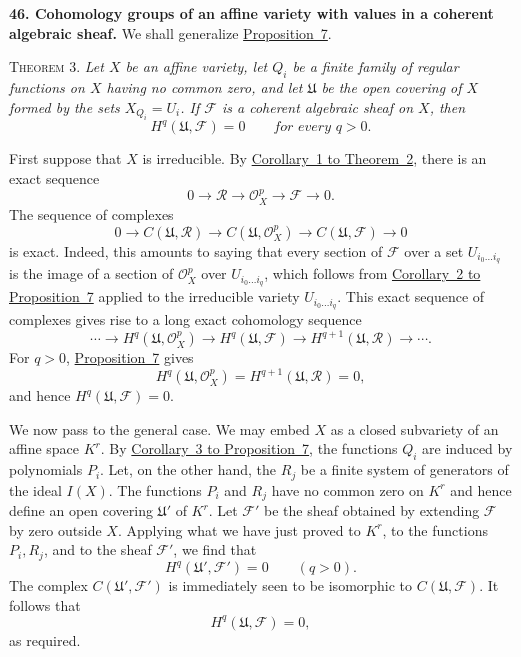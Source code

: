 
\medskip
{}\label{fac:II:3:no:46}
\textbf{46. Cohomology groups of an affine variety with values in a coherent algebraic sheaf.}
We shall generalize \hyperref[fac:II:3:no:44:prop:7]{Proposition~7}.

\label{fac:II:3:no:46:thm:3}
\textsc{Theorem 3.} \textit{Let $X$ be an affine variety, let $Q_i$ be a finite family of regular functions on $X$ having no common zero, and let $\mathfrak{U}$ be the open covering of $X$ formed by the sets $X_{Q_i}=U_i$. If $\mathcal{F}$ is a coherent algebraic sheaf on $X$, then}
\[
H^q(\mathfrak{U},\mathcal{F})=0
\qquad\textit{for every $q>0$.}
\]

First suppose that $X$ is irreducible. By \hyperref[fac:II:3:no:45:thm:2:cor:1]{Corollary~1 to Theorem~2}, there is an exact sequence
\[
0\longrightarrow\mathcal{R}
\longrightarrow\mathcal{O}_X^p
\longrightarrow\mathcal{F}
\longrightarrow0.
\]
The sequence of complexes
\[
0\longrightarrow C(\mathfrak{U},\mathcal{R})
\longrightarrow C(\mathfrak{U},\mathcal{O}_X^p)
\longrightarrow C(\mathfrak{U},\mathcal{F})
\longrightarrow0
\]
is exact. Indeed, this amounts to saying that every section of $\mathcal{F}$ over a set $U_{i_0\ldots i_q}$ is the image of a section of $\mathcal{O}_X^p$ over $U_{i_0\ldots i_q}$, which follows from \hyperref[fac:II:3:no:44:prop:7:cor:2]{Corollary~2 to Proposition~7} applied to the irreducible variety $U_{i_0\ldots i_q}$. This exact sequence of complexes gives rise to a long exact cohomology sequence
\[
\cdots\longrightarrow H^q(\mathfrak{U},\mathcal{O}_X^p)
\longrightarrow H^q(\mathfrak{U},\mathcal{F})
\longrightarrow H^{q+1}(\mathfrak{U},\mathcal{R})
\longrightarrow\cdots.
\]
For $q>0$, \hyperref[fac:II:3:no:44:prop:7]{Proposition~7} gives
\[
H^q(\mathfrak{U},\mathcal{O}_X^p)
=H^{q+1}(\mathfrak{U},\mathcal{R})=0,
\]
and hence $H^q(\mathfrak{U},\mathcal{F})=0$.

We now pass to the general case. We may embed $X$ as a closed subvariety of an affine space $K^r$. By \hyperref[fac:II:3:no:44:prop:7:cor:3]{Corollary~3 to Proposition~7}, the functions $Q_i$ are induced by polynomials $P_i$. Let, on the other hand, the $R_j$ be a finite system of generators of the ideal $I(X)$. The functions $P_i$ and $R_j$ have no common zero on $K^r$ and hence define an open covering $\mathfrak{U}'$ of $K^r$. Let $\mathcal{F}'$ be the sheaf obtained by extending $\mathcal{F}$ by zero outside $X$. Applying what we have just proved to $K^r$, to the functions $P_i,R_j$, and to the sheaf $\mathcal{F}'$, we find that
\[
H^q(\mathfrak{U}',\mathcal{F}')=0
\qquad(q>0).
\]
The complex $C(\mathfrak{U}',\mathcal{F}')$ is immediately seen to be isomorphic to $C(\mathfrak{U},\mathcal{F})$. It follows that
\[
H^q(\mathfrak{U},\mathcal{F})=0,
\]
as required.

